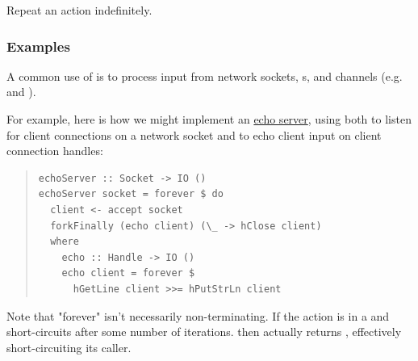 \begin{haddockdesc}
\item[\begin{tabular}{@{}l}
forever :: Applicative f => f a -> f b
\end{tabular}]
{\haddockbegindoc
Repeat an action indefinitely.\par
\subsubsection*{\textbf{Examples}}
A common use of  is to process input from network sockets,
 s, and channels
 (e.g.  and
 ).\par
For example, here is how we might implement an \href{https://en.wikipedia.org/wiki/Echo_Protocol}{echo
 server}, using
  both to listen for client connections on a network socket
 and to echo client input on client connection handles:\par
\begin{quote}
{\haddockverb\begin{verbatim}
echoServer :: Socket -> IO ()
echoServer socket = forever $ do
  client <- accept socket
  forkFinally (echo client) (\_ -> hClose client)
  where
    echo :: Handle -> IO ()
    echo client = forever $
      hGetLine client >>= hPutStrLn client
\end{verbatim}}
\end{quote}
Note that "forever" isn't necessarily non-terminating.
 If the action is in a  and short-circuits after some number of iterations.
 then  actually returns , effectively short-circuiting its caller.\par}
\end{haddockdesc}
